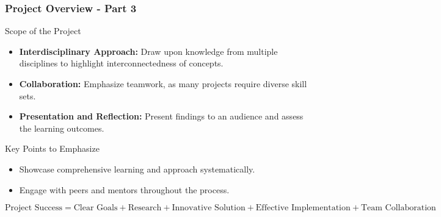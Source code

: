 \documentclass[aspectratio=169]{beamer}
\begin{document}
\begin{frame}[fragile]
  \frametitle{Project Overview - Part 3}
  \begin{block}{Scope of the Project}
    \begin{itemize}
      \item \textbf{Interdisciplinary Approach:}
        Draw upon knowledge from multiple disciplines to highlight interconnectedness of concepts.
      \item \textbf{Collaboration:}
        Emphasize teamwork, as many projects require diverse skill sets.
      \item \textbf{Presentation and Reflection:}
        Present findings to an audience and assess the learning outcomes.
    \end{itemize}
  \end{block}

  \begin{block}{Key Points to Emphasize}
    \begin{itemize}
      \item Showcase comprehensive learning and approach systematically.
      \item Engage with peers and mentors throughout the process.
    \end{itemize}
  \end{block}

  \begin{equation}
    \text{Project Success} = \text{Clear Goals} + \text{Research} + \text{Innovative Solution} + \text{Effective Implementation} + \text{Team Collaboration}
  \end{equation}
\end{frame}
\end{document}
